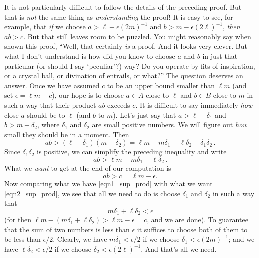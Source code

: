 \begin{rem}  It is not particularly difficult to follow the details of the preceding proof.
But that is \emph{not} the same thing as \emph{understanding} the proof!  It is easy to see,
for example, that \emph{if} we choose $a > \ell - \epsilon(2m)^{-1}$ and $b > m -
\epsilon(2\ell)^{-1}$, \emph{then} $ab>c$.   But that still leaves room to be puzzled.  You
might reasonably say when shown this proof, ``Well, that certainly \emph{is} a proof.  And it
looks very clever.  But what I don't understand is how did you know to choose $a$ and $b$ in
just that particular (or should I say `peculiar'?) way?  Do you operate by fits of
inspiration, or a crystal ball, or divination of entrails, or what?''  The question deserves
an answer. Once we have assumed $c$ to be an upper bound smaller than $\ell m$ (and set
$\epsilon = \ell m - c$), our hope is to choose $a \in A$ close to $\ell$ and $b \in B$ close
to $m$ in such a way that their product $ab$ exceeds $c$.  It is difficult to say immediately
\emph{how} close $a$ should be to $\ell$ (and $b$ to $m$).  Let's just say that $a > \ell -
\delta_1$ and $b > m - \delta_2$, where $\delta_1$ and $\delta_2$ are small positive numbers.
We will figure out \emph{how} small they should be in a moment. Then
  \[ ab > (\ell - \delta_1)(m - \delta_2) = \ell m - m\delta_1
                                       - \ell\delta_2 + \delta_1\delta_2\,. \]
Since $\delta_1\delta_2$ is positive, we can simplify the preceding inequality and write
  \begin{equation}\label{eqn1_sup_prod}
           ab > \ell m - m\delta_1 - \ell\delta_2\,.
  \end{equation}
What we \emph{want} to get at the end of our computation is
  \begin{equation}\label{eqn2_sup_prod}
           ab > c = \ell m - \epsilon.
  \end{equation}
Now comparing what we have \eqref{eqn1_sup_prod} with what we want \eqref{eqn2_sup_prod}, we
see that all we need to do is choose $\delta_1$ and $\delta_2$ in such a way that
  \begin{equation}\label{eqn3_sup_prod}
             m\delta_1 + \ell\delta_2 < \epsilon
  \end{equation}
(for then $\ell m - (m\delta_1 + \ell\delta_2) > \ell m - \epsilon = c$, and we are done).  To
guarantee that the sum of two numbers is less than $\epsilon$ it suffices to choose both of
them to be less than $\epsilon/2$.  Clearly, we have $m\delta_1 < \epsilon/2$ if we choose
$\delta_1 < \epsilon(2m)^{-1}$; and we have $\ell\delta_2 < \epsilon/2$ if we choose $\delta_2
< \epsilon(2\ell)^{-1}$.  And that's all we need.
\end{rem}

